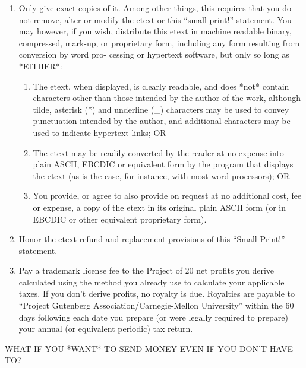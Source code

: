 \documentclass[12pt]{book}
\begin{document}
\begin{enumerate}
\item  Only give exact copies of it.  Among other things, this
     requires that you do not remove, alter or modify the
     etext or this ``small print!'' statement.  You may however,
     if you wish, distribute this etext in machine readable
     binary, compressed, mark-up, or proprietary form,
     including any form resulting from conversion by word pro-
     cessing or hypertext software, but only so long as
     *EITHER*:
\begin{enumerate}
\item     The etext, when displayed, is clearly readable, and
          does *not* contain characters other than those
          intended by the author of the work, although tilde,
          asterisk (*) and underline (\_) characters may
          be used to convey punctuation intended by the
          author, and additional characters may be used to
          indicate hypertext links; OR

\item     The etext may be readily converted by the reader at
          no expense into plain ASCII, EBCDIC or equivalent
          form by the program that displays the etext (as is
          the case, for instance, with most word processors);
          OR

\item     You provide, or agree to also provide on request at
          no additional cost, fee or expense, a copy of the
          etext in its original plain ASCII form (or in EBCDIC
          or other equivalent proprietary form).
\end{enumerate}
\item  Honor the etext refund and replacement provisions of this
    ``Small Print!'' statement.

\item  Pay a trademark license fee to the Project of 20%
     net profits you derive calculated using the method you
     already use to calculate your applicable taxes.  If you
     don't derive profits, no royalty is due.  Royalties are
     payable to ``Project Gutenberg Association/Carnegie-Mellon
     University'' within the 60 days following each
     date you prepare (or were legally required to prepare)
     your annual (or equivalent periodic) tax return.
\end{enumerate}

\begin{center}
WHAT IF YOU *WANT* TO SEND MONEY EVEN IF YOU DON'T HAVE TO?
\end{center}
\end{document}
